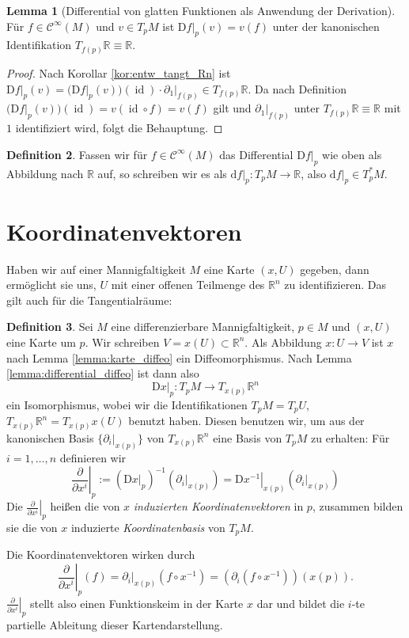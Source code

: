\documentclass[a4paper]{scrreprt}
\numberwithin{equation}{chapter}
\newcommand{\D}{\mathrm{d}}
\newcommand{\DD}{\mathrm{D}}
\DeclareMathOperator{\id}{id}
\newcommand{\sC}{\mathcal{C}^{\infty}}
\theoremstyle{definition}
\newtheorem{defn}{Definition}[section]
\newtheorem{lemma}[defn]{Lemma}
\begin{document}
\begin{lemma}[Differential von glatten Funktionen als Anwendung der Derivation]
	Für $f\in\sC(M)$ und $v \in T_pM$ ist $\left.\DD f\right|_p(v) = v(f)$ unter der kanonischen Identifikation $T_{f(p)}\mathbb R \equiv \mathbb R$.

	\begin{proof}
		Nach Korollar \ref{kor:entw_tangt_Rn} ist $\left.\DD f\right|_p(v) = \Big(\DD f\big|_p(v)\Big)(\id) \cdot \left.\partial_1\right|_{f(p)} \in T_{f(p)}\mathbb R$. Da nach Definition $\Big(\DD f\big|_p(v)\Big)(\id) = v(\id \circ f) = v(f)$ gilt und $\left.\partial_1\right|_{f(p)}$ unter $T_{f(p)}\mathbb R \equiv \mathbb R$ mit $1$ identifiziert wird, folgt die Behauptung.
	\end{proof}
\end{lemma}

\begin{defn}
	Fassen wir für $f \in \sC(M)$ das Differential $\left.\DD f\right|_p$ wie oben als Abbildung nach $\mathbb R$ auf, so schreiben wir es als $\left.\D f\right|_p \colon T_pM \to \mathbb R$, also $\left.\D f\right|_p \in T_p^*M$.
\end{defn}

\section{Koordinatenvektoren}

Haben wir auf einer Mannigfaltigkeit $M$ eine Karte $(x,U)$ gegeben, dann ermöglicht sie uns, $U$ mit einer offenen Teilmenge des $\mathbb R^n$ zu identifizieren. Das gilt auch für die Tangentialräume:
\begin{defn}
	Sei $M$ eine differenzierbare Mannigfaltigkeit, $p\in M$ und $(x,U)$ eine Karte um $p$. Wir schreiben $V = x(U) \subset \mathbb R^n$. Als Abbildung $x\colon U \to V$ ist $x$ nach Lemma \ref{lemma:karte_diffeo} ein Diffeomorphismus. Nach Lemma \ref{lemma:differential_diffeo} ist dann also
	\[\left.\DD x\right|_p \colon T_pM \to T_{x(p)} \mathbb R^n\]
	ein Isomorphismus, wobei wir die Identifikationen $T_pM = T_pU$, $T_{x(p)}\mathbb R^n = T_{x(p)} x(U)$ benutzt haben. Diesen benutzen wir, um aus der kanonischen Basis $\{\left.\partial_i\right|_{x(p)}\}$ von $T_{x(p)}\mathbb R^n$ eine Basis von $T_pM$ zu erhalten: Für $i = 1,\dots, n$ definieren wir
	\[\left.\frac{\partial}{\partial x^i}\right|_p := \left(\left.\DD x\right|_p\right)^{-1} \left(\left.\partial_i\right|_{x(p)}\right) = \left.\DD x^{-1}\right|_{x(p)} \left(\left.\partial_i\right|_{x(p)}\right)\]
	Die $\left.\frac{\partial}{\partial x^i}\right|_p$ heißen die von $x$ \emph{induzierten Koordinatenvektoren} in $p$, zusammen bilden sie die von $x$ induzierte \emph{Koordinatenbasis} von $T_pM$.
\end{defn}
Die Koordinatenvektoren wirken durch
\[\left.\frac{\partial}{\partial x^i}\right|_p(f) = \left.\partial_i\right|_{x(p)} (f \circ x^{-1}) = \left(\partial_i (f\circ x^{-1})\right) (x(p)).\]
$\left.\frac{\partial}{\partial x^i}\right|_p$ stellt also einen Funktionskeim in der Karte $x$ dar und bildet die $i$-te partielle Ableitung dieser Kartendarstellung.
\end{document}
